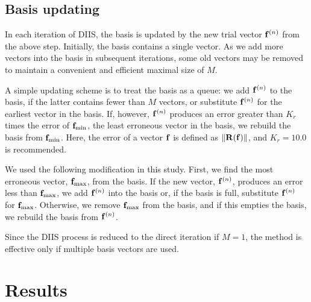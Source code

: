 \documentclass[aip,jcp,preprint,superscriptaddress]{revtex4-1}
\begin{document}
\subsection{\label{sec:basis_updating}Basis updating}



In each iteration of DIIS,
the basis is updated
by the new trial vector $\mathbf{f}^{(n)}$
from the above step.
%
Initially,
the basis contains a single vector.
%
As we add more vectors into the basis in subsequent iterations,
some old vectors may be removed
to maintain a convenient and efficient maximal size of $M$.



A simple updating scheme\cite{kovalenko1999}
is to treat the basis as a queue:
%
we add $\mathbf{f}^{(n)}$ to the basis,
if the latter contains fewer than $M$ vectors,
%
or substitute $\mathbf{f}^{(n)}$ for the earliest vector in the basis.
%
If, however, $\mathbf{f}^{(n)}$
produces an error greater than
$K_r$ times the error of
$\mathbf{f}_\mathrm{min}$,
the least erroneous vector in the basis,
%
we rebuild the basis
from $\mathbf{f}_\mathrm{min}$.
%
Here, the error of a vector $\mathbf{f}$ is defined as
$\| \mathbf{R}(\mathbf{f}) \|$,
and
$K_r = 10.0$ is recommended\cite{
kovalenko1999}.



We used the following modification
in this study.
%
%
%
%
First, we find the most erroneous vector,
$\mathbf{f}_\mathrm{max}$, from the basis.
%
If the new vector, $\mathbf{f}^{(n)}$,
produces an error less than $\mathbf{f}_\mathrm{max}$,
we add $\mathbf{f}^{(n)}$ into the basis
or, if the basis is full,
substitute $\mathbf{f}^{(n)}$ for $\mathbf{f}_\mathrm{max}$.
%
Otherwise,
we remove $\mathbf{f}_\mathrm{max}$ from the basis,
and if this empties the basis,
we rebuild the basis from $\mathbf{f}^{(n)}$.



Since the DIIS process is reduced
to the direct iteration
if $M = 1$,
the method is effective
only if multiple basis vectors are used.
%




\section{Results}
\end{document}
